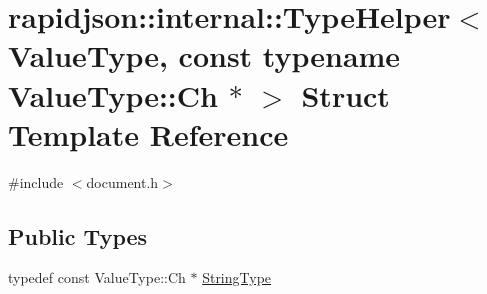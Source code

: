 \hypertarget{structrapidjson_1_1internal_1_1_type_helper_3_01_value_type_00_01const_01typename_01_value_type_1_1_ch_01_5_01_4}{}\section{rapidjson\+::internal\+::Type\+Helper$<$ Value\+Type, const typename Value\+Type\+::Ch $\ast$ $>$ Struct Template Reference}
\label{structrapidjson_1_1internal_1_1_type_helper_3_01_value_type_00_01const_01typename_01_value_type_1_1_ch_01_5_01_4}


{\ttfamily \#include $<$document.\+h$>$}

\subsection*{Public Types}
\begin{DoxyCompactItemize}
\item 
typedef const Value\+Type\+::\+Ch $\ast$ \mbox{\hyperlink{structrapidjson_1_1internal_1_1_type_helper_3_01_value_type_00_01const_01typename_01_value_type_1_1_ch_01_5_01_4_a511422342701bd19c777d477275991e8}{String\+Type}}
\end{DoxyCompactItemize}
